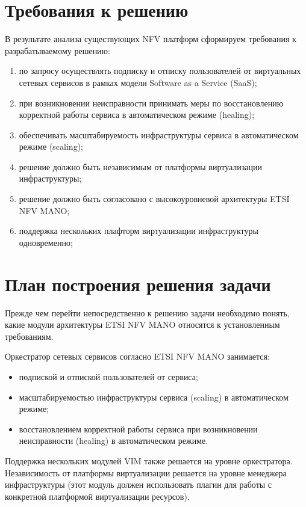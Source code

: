 \documentclass[oneside,final,14pt,a4paper]{extreport}
\begin{document}
\section{Требования к решению}
В результате анализа существующих NFV платформ сформируем требования к разрабатываемому решению:
\begin{enumerate}
	\item по запросу осуществлять подписку и отписку пользователей от виртуальных сетевых сервисов в рамках модели Software as a Service (SaaS);
	\item при возникновении неисправности принимать меры по восстановлению корректной работы сервиса в автоматическом режиме (healing);
	\item обеспечивать масштабируемость инфраструктуры сервиса в автоматическом режиме (scaling);
	\item решение должно быть независимым от платформы виртуализации инфраструктуры;
	\item решение должно быть согласовано с высокоуровневой архитектуры ETSI NFV MANO;
	\item поддержка нескольких плафторм виртуализации инфраструктуры одновременно;
\end{enumerate}


\section{План построения решения задачи}
\label{section-platform-requirements}
Прежде чем перейти непосредственно к решению задачи необходимо понять, какие модули архитектуры ETSI NFV MANO относятся к установленным требованиям.

Оркестратор сетевых сервисов согласно ETSI NFV MANO занимается:
\begin{itemize}
	\item подпиской и отпиской пользователей от сервиса;
	\item масштабируемостью инфраструктуры сервиса (scaling) в автоматическом режиме;
	\item восстановлением корректной работы сервиса при возникновении неисправности (healing) в автоматическом режиме.
\end{itemize}

Поддержка нескольких модулей VIM также решается на уровне оркестратора. Независимость от платформы виртуализации решается на уровне менеджера инфраструктуры (этот модуль должен использовать плагин для работы с конкретной платформой виртуализации ресурсов).
\end{document}
